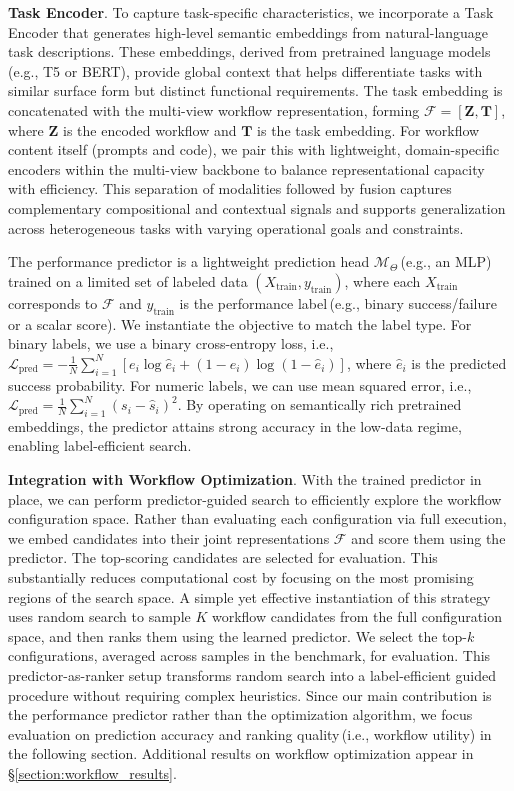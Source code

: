 \textbf{Task Encoder}. To capture task-specific characteristics, we incorporate a Task Encoder that generates high-level semantic embeddings from natural-language task descriptions. These embeddings, derived from pretrained language models\,(e.g., T5 or BERT), provide global context that helps differentiate tasks with similar surface form but distinct functional requirements. The task embedding is concatenated with the multi-view workflow representation, forming $\mathcal{F} = [\mathbf{Z}, \mathbf{T}]$, where $\mathbf{Z}$ is the encoded workflow and $\mathbf{T}$ is the task embedding. For workflow content itself (prompts and code), we pair this with lightweight, domain-specific encoders within the multi-view backbone to balance representational capacity with efficiency. This separation of modalities followed by fusion captures complementary compositional and contextual signals and supports generalization across heterogeneous tasks with varying operational goals and constraints.

The performance predictor is a lightweight prediction head $\mathcal{M}_{\Theta}$\,(e.g., an MLP) trained on a limited set of labeled data ${(X_{\text{train}}, y_{\text{train}})}$, where each $X_{\text{train}}$ corresponds to $\mathcal{F}$ and $y_{\text{train}}$ is the performance label\,(e.g., binary success/failure or a scalar score). We instantiate the objective to match the label type. For binary labels, we use a binary cross-entropy loss, i.e., $\mathcal{L}_{\text{pred}} = - \frac{1}{N} \sum_{i=1}^{N} \left[ e_i \log \hat{e}_i + (1 - e_i) \log (1 - \hat{e}_i) \right]$, where $\hat{e}_i$ is the predicted success probability. For numeric labels, we can use mean squared error, i.e., $\mathcal{L}_{\text{pred}} = \frac{1}{N}\sum_{i=1}^{N} (s_i - \hat{s}_i)^2$. By operating on semantically rich pretrained embeddings, the predictor attains strong accuracy in the low-data regime, enabling label-efficient search.



\textbf{Integration with Workflow Optimization}. With the trained predictor in place, we can perform predictor-guided search to efficiently explore the workflow configuration space. Rather than evaluating each configuration via full execution, we embed candidates into their joint representations $\mathcal{F}$ and score them using the predictor. The top-scoring candidates are selected for evaluation. This substantially reduces computational cost by focusing on the most promising regions of the search space. A simple yet effective instantiation of this strategy uses random search to sample $K$ workflow candidates from the full configuration space, and then ranks them using the learned predictor. We select the top-$k$ configurations, averaged across samples in the benchmark, for evaluation. This predictor-as-ranker setup transforms random search into a label-efficient guided procedure without requiring complex heuristics. Since our main contribution is the performance predictor rather than the optimization algorithm, we focus evaluation on prediction accuracy and ranking quality\,(i.e., workflow utility) in the following section. Additional results on workflow optimization appear in \S\ref{section:workflow_results}.